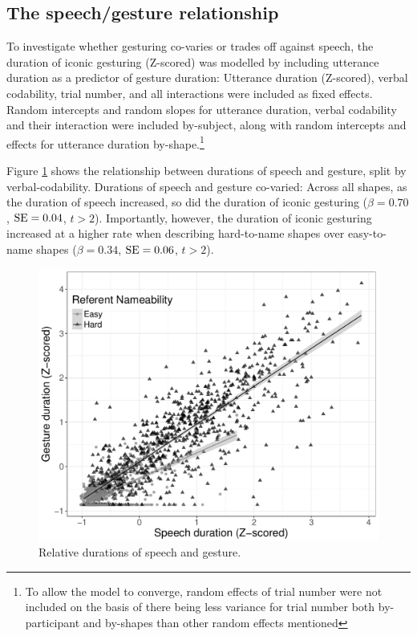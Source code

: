 \documentclass[a4paper,man,natbib]{apa6}
\newcommand{\resultsLM}[3]{$\beta = #1$, $\textnormal{SE} = #2$, $t #3$}
\begin{document}
\subsection{The speech/gesture relationship}
To investigate whether gesturing co-varies or trades off against speech, the duration of iconic gesturing (Z-scored) was modelled by including utterance duration as a predictor of gesture duration: Utterance duration (Z-scored), verbal codability, trial number, and all interactions were included as fixed effects. 
Random intercepts and random slopes for utterance duration, verbal codability and their interaction were included by-subject, along with random intercepts and effects for utterance duration by-shape.\footnote{To allow the model to converge, random effects of trial number were not included on the basis of there being less variance for trial number both by-participant and by-shapes than other random effects mentioned}

Figure \ref{fig:sgplot} shows the relationship between durations of speech and gesture, split by verbal-codability.
Durations of speech and gesture co-varied: Across all shapes, as the duration of speech increased, so did the duration of iconic gesturing (\resultsLM{0.70}{0.04}{>2}).
Importantly, however, the duration of iconic gesturing increased at a higher rate when describing hard-to-name shapes over easy-to-name shapes (\resultsLM{0.34}{0.06}{>2}).


\begin{figure}
  \centering
	\includegraphics[width=\linewidth]{img/sgplot.pdf}
  \caption{Relative durations of speech and gesture.}
  \label{fig:sgplot}
\end{figure}
\end{document}
